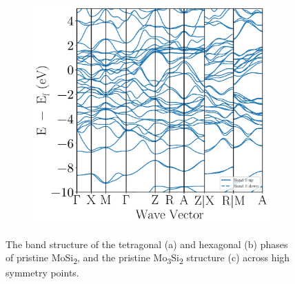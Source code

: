 \documentclass[7.5pt]{article}
\theoremstyle{plain}
\theoremstyle{definition}
\newcommand{\<}{\langle}
\renewcommand{\>}{\rangle}
\begin{document}
\begin{figure}
\begin{subfigure}{.32\textwidth}
  \caption{}
\label{fig:bs-mosi2-hexa}
\end{subfigure}%
\begin{subfigure}{.32\textwidth}
  \centering
  \includegraphics[width=\linewidth]{bs_Mo3Si2}
  \caption{}
\label{fig:bs-mo3si2}
\end{subfigure}
\caption{The band structure of the tetragonal (a) and hexagonal (b) phases of pristine MoSi\textsubscript{2}, and the pristine Mo\textsubscript{3}Si\textsubscript{2} structure (c) across high symmetry points.}
\label{fig:bs_MoSi2}
\end{figure}
\end{document}
